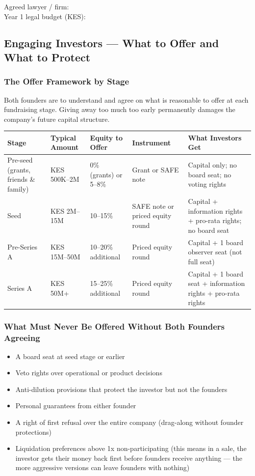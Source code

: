 \documentclass[12pt,a4paper]{article}
\newcommand{\blank}[1][5.5cm]{\underline{\hspace{#1}}}
\begin{document}
\noindent Agreed lawyer / firm: \blank[7cm]\\[0.5em]
\noindent Year 1 legal budget (KES): \blank[5cm]

\subsection{Engaging Investors --- What to Offer and What to Protect}

\subsubsection{The Offer Framework by Stage}

Both founders are to understand and agree on what is reasonable to offer at each fundraising stage. Giving away too much too early permanently damages the company's future capital structure.

\begin{tabularx}{\linewidth}{L{2.5cm} L{2.5cm} L{3cm} L{2.5cm} X}
  \toprule
  \textbf{Stage} & \textbf{Typical Amount} & \textbf{Equity to Offer} & \textbf{Instrument} & \textbf{What Investors Get} \\
  \midrule
  Pre-seed (grants, friends \& family) & KES 500K--2M & 0\% (grants) or 5--8\% & Grant or SAFE note & Capital only; no board seat; no voting rights \\[0.5em]
  Seed & KES 2M--15M & 10--15\% & SAFE note or priced equity round & Capital + information rights + pro-rata rights; no board seat \\[0.5em]
  Pre-Series A & KES 15M--50M & 10--20\% additional & Priced equity round & Capital + 1 board observer seat (not full seat) \\[0.5em]
  Series A & KES 50M+ & 15--25\% additional & Priced equity round & Capital + 1 board seat + information rights + pro-rata rights \\
  \bottomrule
\end{tabularx}

\subsubsection{What Must Never Be Offered Without Both Founders Agreeing}

\begin{itemize}
  \item A board seat at seed stage or earlier
  \item Veto rights over operational or product decisions
  \item Anti-dilution provisions that protect the investor but not the founders
  \item Personal guarantees from either founder
  \item A right of first refusal over the entire company (drag-along without founder protections)
  \item Liquidation preferences above 1x non-participating (this means in a sale, the investor gets their money back first before founders receive anything --- the more aggressive versions can leave founders with nothing)
\end{itemize}
\end{document}
